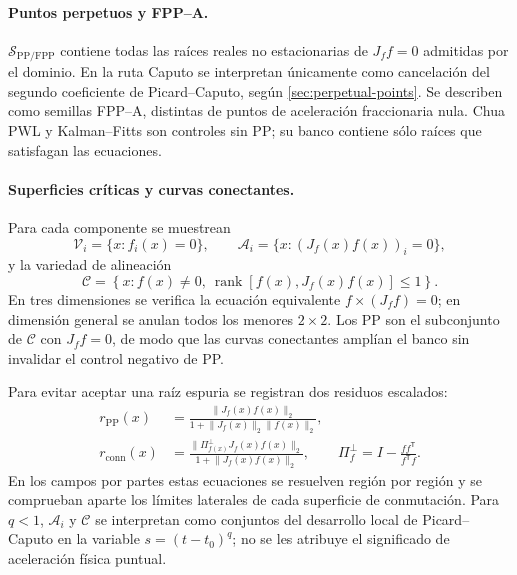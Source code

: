 \paragraph{Puntos perpetuos y FPP--A.}
\(\mathcal S_{\mathrm{PP/FPP}}\) contiene todas las raíces reales no
estacionarias de \(J_f f=0\) admitidas por el dominio. En la ruta Caputo se
interpretan únicamente como cancelación del segundo coeficiente de
Picard--Caputo, según \cref{sec:perpetual-points}. Se describen como semillas
FPP--A, distintas de puntos de aceleración fraccionaria nula. Chua PWL y
Kalman--Fitts son controles sin PP; su banco contiene sólo raíces que satisfagan
las ecuaciones.

\paragraph{Superficies críticas y curvas conectantes.}
Para cada componente se muestrean
\begin{equation}
 \mathcal V_i=\{x:f_i(x)=0\},
 \qquad
 \mathcal A_i=\{x:(J_f(x)f(x))_i=0\},
 \label{camp:eq-critical-surfaces}
\end{equation}
y la variedad de alineación
\begin{equation}
 \mathcal C=
 \left\{x:f(x)\neq0,\
 \operatorname{rank}[f(x),J_f(x)f(x)]\leq1\right\}.
 \label{camp:eq-connecting-set}
\end{equation}
En tres dimensiones se verifica la ecuación equivalente
\(f\times(J_f f)=0\); en dimensión general se anulan todos los menores
\(2\times2\). Los PP son el subconjunto de \(\mathcal C\) con \(J_f f=0\), de
modo que las curvas conectantes amplían el banco sin invalidar el control
negativo de PP.

Para evitar aceptar una raíz espuria se registran dos residuos escalados:
\begin{align}
 r_{\mathrm{PP}}(x)
 &=\frac{\lVert J_f(x)f(x)\rVert_2}
        {1+\lVert J_f(x)\rVert_2\lVert f(x)\rVert_2},
 \label{camp:eq-pp-residual}\\
 r_{\mathrm{conn}}(x)
 &=\frac{\lVert \Pi_{f(x)}^{\perp}J_f(x)f(x)\rVert_2}
        {1+\lVert J_f(x)f(x)\rVert_2},
 \qquad
 \Pi_f^{\perp}=I-\frac{ff^{\mathsf T}}{f^{\mathsf T}f}.
 \label{camp:eq-connecting-residual}
\end{align}
En los campos por partes estas ecuaciones se resuelven región por región y se
comprueban aparte los límites laterales de cada superficie de conmutación.
Para \(q<1\), \(\mathcal A_i\) y \(\mathcal C\) se interpretan como conjuntos
del desarrollo local de Picard--Caputo en la variable \(s=(t-t_0)^q\); no se
les atribuye el significado de aceleración física puntual.

